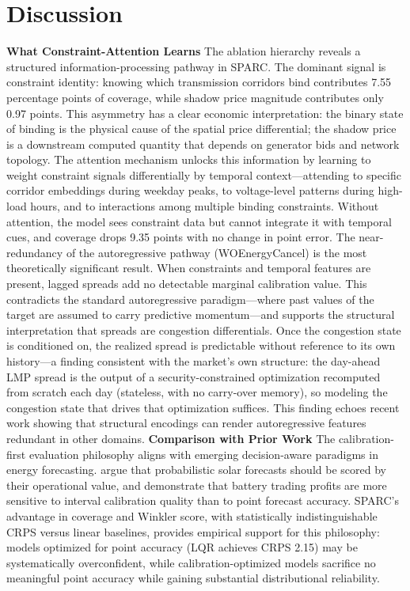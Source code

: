 \documentclass[twoside]{article}
\begin{document}
\section{Discussion}
\textbf{What Constraint-Attention Learns}
The ablation hierarchy reveals a structured information-processing pathway in SPARC. The dominant signal is constraint identity: knowing which transmission corridors bind contributes 7.55 percentage points of coverage, while shadow price magnitude contributes only 0.97 points. This asymmetry has a clear economic interpretation: the binary state of binding is the physical cause of the spatial price differential; the shadow price is a downstream computed quantity that depends on generator bids and network topology. The attention mechanism unlocks this information by learning to weight constraint signals differentially by temporal context---attending to specific corridor embeddings during weekday peaks, to voltage-level patterns during high-load hours, and to interactions among multiple binding constraints. Without attention, the model sees constraint data but cannot integrate it with temporal cues, and coverage drops 9.35 points with no change in point error.
The near-redundancy of the autoregressive pathway (WOEnergyCancel) is the most theoretically significant result. When constraints and temporal features are present, lagged spreads add no detectable marginal calibration value. This contradicts the standard autoregressive paradigm---where past values of the target are assumed to carry predictive momentum---and supports the structural interpretation that spreads are congestion differentials. Once the congestion state is conditioned on, the realized spread is predictable without reference to its own history---a finding consistent with the market's own structure: the day-ahead LMP spread is the output of a security-constrained optimization recomputed from scratch each day (stateless, with no carry-over memory), so modeling the congestion state that drives that optimization suffices. This finding echoes recent work showing that structural encodings can render autoregressive features redundant in other domains.
\textbf{Comparison with Prior Work}
The calibration-first evaluation philosophy aligns with emerging decision-aware paradigms in energy forecasting. \cite{hobbs2022probabilistic} argue that probabilistic solar forecasts should be scored by their operational value, and \cite{hirsch2026probabilistic} demonstrate that battery trading profits are more sensitive to interval calibration quality than to point forecast accuracy. SPARC's advantage in coverage and Winkler score, with statistically indistinguishable CRPS versus linear baselines, provides empirical support for this philosophy: models optimized for point accuracy (LQR achieves CRPS 2.15) may be systematically overconfident, while calibration-optimized models sacrifice no meaningful point accuracy while gaining substantial distributional reliability.
\end{document}

